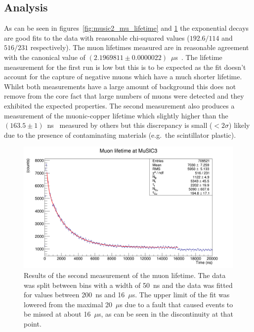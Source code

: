 \subsection{Analysis} %
\label{sec:analysis}
As can be seen in figures~\ref{fig:music2_mu_lifetime} and \ref{fig:music3_muon_lifetime} the exponential decays are good fits to the data with reasonable chi-squared values (\(192.6/114\) and \( 516/231 \) respectively). The muon lifetimes measured are in reasonable agreement with the canonical value of \((2.1969811\pm0.0000022)\)~\(\mu\)s~\cite{pdg}. The lifetime measurement for the first run is low but this is to be expected as the fit doesn't account for the capture of negative muons which have a much shorter lifetime. Whilst both measurements have a large amount of background this does not remove from the core fact that large numbers of muons were detected and they exhibited the expected properties. The second measurement also produces a measurement of the muonic-copper lifetime which slightly higher than the \((163.5\pm1)\)~ns~\cite{suzuki_mu_capture_rates} measured by others but this discrepancy is small (\(<2\sigma\)) likely due to the presence of contaminating materials (e.g.\ the scintillator plastic).

\begin{figure}[hptb]
  \centering
  \includegraphics[width=.9\textwidth]{images/lifetime/music3_muon_lifetime.png}
  \caption{Results of the second measurement of the muon lifetime. The data was split between bins with a width of 50~ns and the data was fitted for values between 200~ns and 16~\(\mu\)s. The upper limit of the fit was lowered from the maximal 20~\(\mu\)s due to a fault that caused events to be missed at about 16~\(\mu\)s, as can be seen in the discontinuity at that point.}
  \label{fig:music3_muon_lifetime}
\end{figure}

